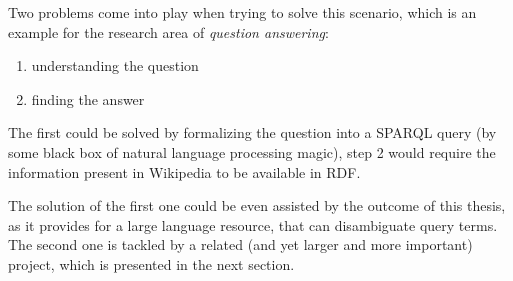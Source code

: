 Two problems come into play when trying to solve this scenario, which is an example for the research area of \textit{question answering}:

\begin{enumerate}
\item understanding the question
\item finding the answer
\end{enumerate}

The first could be solved by formalizing the question into a SPARQL query (by some black box of natural language processing magic), step 2 would require the information present in Wikipedia to be available in RDF.

The solution of the first one could be even assisted by the outcome of this thesis, as it provides for a large language resource, that can disambiguate query terms. The second one is tackled by a related (and yet larger and more important) project, which is presented in the next section.



